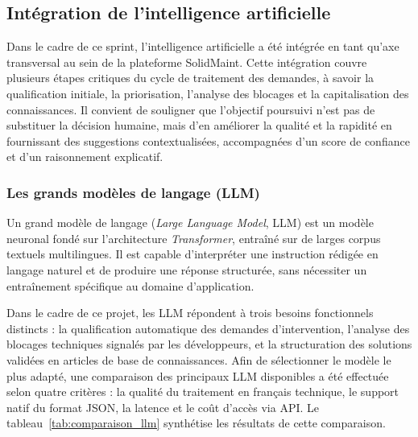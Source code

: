 


\subsection{Intégration de l'intelligence artificielle}

Dans le cadre de ce sprint, l'intelligence artificielle a été intégrée
en tant qu'axe transversal au sein de la plateforme SolidMaint. Cette
intégration couvre plusieurs étapes critiques du cycle de traitement
des demandes, à savoir la qualification initiale, la priorisation,
l'analyse des blocages et la capitalisation des connaissances. Il
convient de souligner que l'objectif poursuivi n'est pas de substituer
la décision humaine, mais d'en améliorer la qualité et la rapidité
en fournissant des suggestions contextualisées, accompagnées d'un
score de confiance et d'un raisonnement explicatif.

\subsubsection{Les grands modèles de langage (LLM)}

Un grand modèle de langage (\textit{Large Language Model}, LLM) est
un modèle neuronal fondé sur l'architecture \textit{Transformer},
entraîné sur de larges corpus textuels multilingues. Il est capable
d'interpréter une instruction rédigée en langage naturel et de
produire une réponse structurée, sans nécessiter un entraînement
spécifique au domaine d'application.

\noindent Dans le cadre de ce projet, les LLM répondent à trois
besoins fonctionnels distincts : la qualification automatique des
demandes d'intervention, l'analyse des blocages techniques signalés
par les développeurs, et la structuration des solutions validées
en articles de base de connaissances. Afin de sélectionner le modèle
le plus adapté, une comparaison des principaux LLM disponibles a été
effectuée selon quatre critères : la qualité du traitement en français
technique, le support natif du format JSON, la latence et le coût
d'accès via API. Le tableau~\ref{tab:comparaison_llm} synthétise
les résultats de cette comparaison.

